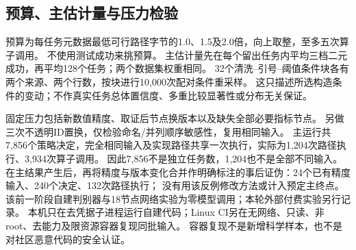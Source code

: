\subsection{预算、主估计量与压力检验}
预算为每任务元数据最低可行路径字节的1.0、1.5及2.0倍，向上取整，至多五次算子调用。
不使用测试成功来挑预算。
主估计量先在每个留出任务内平均三档二元成功，再平均128个任务；两个数据集权重相同。
32个清洗--引号--阈值条件块各有两个来源、两个行数，按块进行10,000次配对条件重采样。
这只描述所选构造条件的变动；不作真实任务总体置信度、多重比较显著性或分布无关保证。

固定压力包括新数值精度、取证后节点换版本以及缺失全部必要指标节点。
另做三次不透明ID置换，仅检验命名/并列顺序敏感性，复用相同输入。
主运行共7,856个策略决定，完全相同输入及实现路径共享一次执行，实际为1,204次路径执行、3,934次算子调用。
因此7,856不是独立任务数，1,204也不是全部不同输入。
在主结果产生后，再将精度与版本变化合并作明确标注的事后证伪：24个已有精度输入、240个决定、132次路径执行；
没有用该反例修改方法或计入预定主终点。
该前一阶段自建判别器与18节点网络实验为零模型调用；本轮外部付费实验另行记录。
本机只在去凭据子进程运行自建代码；Linux CI另在无网络、只读、非root、去能力及限资源容器复现同批输入。
容器复现不是新增科学样本，也不是对社区恶意代码的安全认证。
